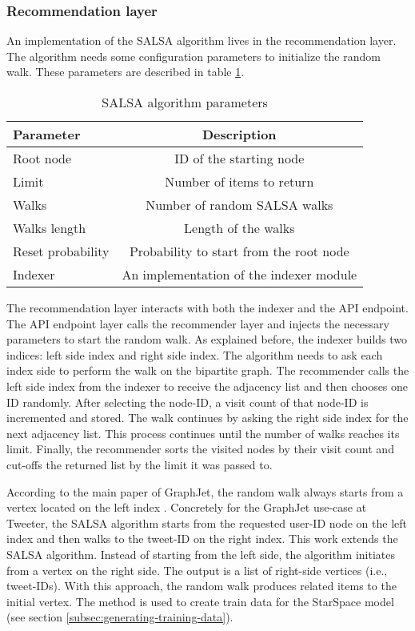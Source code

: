 \subsubsection{Recommendation layer}
\label{subsubsec:recommendation-layer}
An implementation of the SALSA \cite{lempelSALSAStochasticApproach2001} algorithm lives in the recommendation layer. The algorithm needs some configuration parameters to initialize the random walk. These parameters are described in table \ref{tab:salsa-parameters}.


\begin{table}[!h]
    \centering
    \caption{SALSA algorithm parameters}
    \label{tab:salsa-parameters}
    \begin{tabular}{|l|c|}
        \hline
        \textbf{Parameter} & \textbf{Description} \\
        \hline
        Root node & ID of the starting node \\
        \hline
        Limit & Number of items to return \\
        \hline
        Walks & Number of random SALSA walks \\
        \hline
        Walks length & Length of the walks \\
        \hline
        Reset probability & Probability to start from the root node \\
        \hline
        Indexer & An implementation of the indexer module \\
        \hline
    \end{tabular}
\end{table}


The recommendation layer interacts with both the indexer and the API endpoint. The API endpoint layer calls the recommender layer and injects the necessary parameters to start the random walk. As explained before, the indexer builds two indices: left side index and right side index. The algorithm needs to ask each index side to perform the walk on the bipartite graph. The recommender calls the left side index from the indexer to receive the adjacency list and then chooses one ID randomly. After selecting the node-ID, a visit count of that node-ID is incremented and stored. The walk continues by asking the right side index for the next adjacency list. This process continues until the number of walks reaches its limit. Finally, the recommender sorts the visited nodes by their visit count and cut-offs the returned list by the limit it was passed to.


According to the main paper of GraphJet, the random walk always starts from a vertex located on the left index \cite{sharmaGraphJetRealtimeContent2016}. Concretely for the GraphJet use-case at Tweeter, the SALSA algorithm starts from the requested user-ID node on the left index and then walks to the tweet-ID on the right index. This work extends the SALSA algorithm. Instead of starting from the left side, the algorithm initiates from a vertex on the right side. The output is a list of right-side vertices (i.e., tweet-IDs). With this approach, the random walk produces related items to the initial vertex. The method is used to create train data for the StarSpace model (see section \ref{subsec:generating-training-data}).

